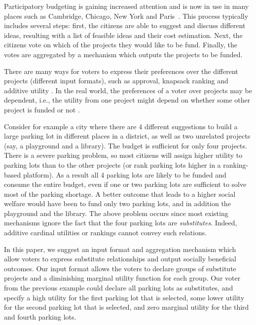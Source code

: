 \documentclass[runningheads]{llncs}
\begin{document}
Participatory budgeting is gaining increased attention and is now in use in many places such as  Cambridge, Chicago, New York and Paris~\cite{pape2016budgeting, su2017porto, sintomer2008porto}. 
This process typically includes several steps: first, the citizens are able to suggest and discuss  different ideas, resulting with a   list of feasible ideas and  their cost estimation. Next,  the citizens vote on which of the projects they would like to be fund. Finally, the votes are aggregated by a mechanism which outputs the   projects to be funded.






There are many ways for voters to express their preferences over the different   projects (different input formats), such as approval, knapsack ranking and additive utility \cite{aziz2020participatory,goel2016knapsack,aziz2020expanding, benade2020preference,peters2020proportional}. 
In the real world, the preferences of a voter over projects may be dependent, i.e., the utility from one project might depend on whether some other project is funded or not \cite{jain2020participatory}.

Consider for example a city where there are 4 different suggestions to build a large parking lot in different places in a district, as well as two unrelated projects (say, a playground and a library). The budget is sufficient for only four projects.
There is a severe parking problem, so most citizens will assign higher utility to parking lots than to the other projects (or rank parking lots higher in a ranking-based platform). As a result all 4 parking lots are likely to be funded and consume the entire budget, even if one or two parking lots are sufficient to solve most of the parking shortage.
A better outcome that leads to a higher social welfare would have been to fund only two parking lots, and in addition the playground and the library. 
The above problem occurs since most existing mechanisms ignore the fact that the four parking lots are \emph{substitutes}. Indeed, additive cardinal utilities or rankings cannot convey such relations. 

In this paper,  we suggest an input format and aggregation mechanism which allow  voters to express substitute relationships and output socially beneficial outcomes.
 Our input format  allows  the voters to declare groups of substitute projects and   a diminishing marginal utility function for each group. 
Our  voter from the previous example could declare all parking lots as substitutes, and specify a high utility for the first parking lot that is selected, some lower utility for the second parking lot that is  selected, and zero marginal utility for the third and fourth parking lots. 
\end{document}
